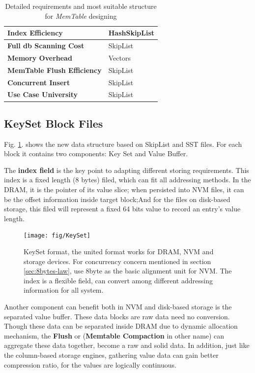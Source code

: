 \begin{table}
	\centering
	\begin{tabular}{|p{}|p{}|}
		\hline
		\textbf{Index Efficiency} & HashSkipList \\ \hline
		\textbf{Full db Scanning Cost} & SkipList \\ \hline
		\textbf{Memory Overhead} & Vectors \\ \hline
		\textbf{MemTable Flush Efficiency} & SkipList \\ \hline
		\textbf{Concurrent Insert} & SkipList \\ \hline
		\textbf{Use Case University} & SkipList\\ \hline
	\end{tabular}
	\caption{Detailed requirements and most suitable structure for \textit{MemTable} designing}
	\label{tab:memtable_requirment}
\end{table}

\subsection{KeySet Block Files}\label{sec:format_introduction}
Fig. \ref{fig:keyset}. shows the new data structure based on SkipList and SST files. For each block it contains two components: Key Set and Value Buffer. 

The \textbf{index field} is the key point to adapting different storing requirements. This index is a fixed length (8 bytes) filed, which can fit all addressing methods. In the DRAM, it is the pointer of its value slice; when persisted into NVM files, it can be the offset information inside target block;And for the files on disk-based storage, this filed will represent a fixed 64 bits value to record an entry's value length.

\begin{figure}
	\centering
	\texttt{[image: fig/KeySet]}
	\caption{KeySet format, the united format works for DRAM, NVM and storage devices. For concurrency concern mentioned in section \ref{sec:8bytes-law}, use 8byte as the basic alignment unit for NVM. The index is a flexible field, can convert among different addressing information for all system.}
	\label{fig:keyset}
\end{figure}

Another component can benefit both in NVM and disk-based storage is the separated value buffer. These data blocks are raw data need no conversion. Though these data can be separated inside DRAM due to dynamic allocation mechanism, the \textbf{Flush} or (\textbf{Memtable Compaction} in other name) can aggregate these data together, become a raw and solid data. In addition, just like the column-based storage engines, gathering value data can gain better compression ratio, for the values are logically continuous.

